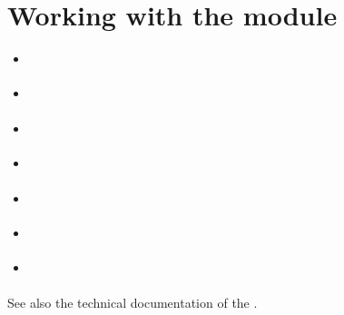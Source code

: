 \documentclass[a4paper,12pt,english]{sphinxhowto}
\begin{document}
\section{Working with the  module}
\label{\detokenize{tutorial:working-with-the-outrankingdigraphs-module}}\label{\detokenize{tutorial:outrankingdigraphs-tutorial-label}}
\begin{sphinxShadowBox}
\begin{itemize}
\item {} 
\label{\detokenize{tutorial:id179}}{\hyperref[\detokenize{tutorial:outranking-digraph}]{}}

\item {} 
\label{\detokenize{tutorial:id180}}{\hyperref[\detokenize{tutorial:browsing-the-performances}]{}}

\item {} 
\label{\detokenize{tutorial:id181}}{\hyperref[\detokenize{tutorial:valuation-semantics}]{}}

\item {} 
\label{\detokenize{tutorial:id182}}{\hyperref[\detokenize{tutorial:pairwise-comparisons}]{}}

\item {} 
\label{\detokenize{tutorial:id183}}{\hyperref[\detokenize{tutorial:recoding-the-valuation}]{}}

\item {} 
\label{\detokenize{tutorial:id184}}{\hyperref[\detokenize{tutorial:the-strict-outranking-digraph}]{}}

\item {} 
\label{\detokenize{tutorial:id185}}{\hyperref[\detokenize{tutorial:xmcda-2-0}]{}}

\end{itemize}
\end{sphinxShadowBox}

See also the technical documentation of the .
\end{document}
